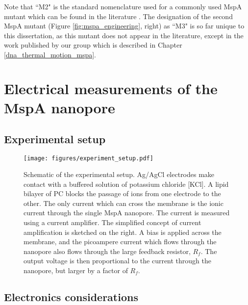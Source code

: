 Note that ``M2" is the standard nomenclature used for a commonly used MspA mutant which can be found in the literature \citep{Butler2008,Manrao2012,Schreiber2013,Derrington2015}.  The designation of the second MspA mutant (Figure \ref{fig:mspa_engineering}, right) as ``M3" is so far unique to this dissertation, as this mutant does not appear in the literature, except in the work published by our group \citep{Lu2015,Fleming2017} which is described in Chapter \ref{dna_thermal_motion_mspa}.

\section{Electrical measurements of the MspA nanopore}

\subsection{Experimental setup}

\begin{figure}[h]
\begin{centering}
\texttt{[image: figures/experiment\_setup.pdf]}
\caption[Experimental setup]{Schematic of the experimental setup.  Ag/AgCl electrodes make contact with a buffered solution of potassium chloride [KCl].  A lipid bilayer of PC blocks the passage of ions from one electrode to the other.  The only current which can cross the membrane is the ionic current through the single MspA nanopore.  The current is measured using a current amplifier.  The simplified concept of current amplification is sketched on the right.  A bias is applied across the membrane, and the picoampere current which flows through the nanopore also flows through the large feedback resistor, $R_f$.  The output voltage is then proportional to the current through the nanopore, but larger by a factor of $R_f$.}
\label{fig:setup}
\end{centering}
\end{figure}

\subsection{Electronics considerations}

